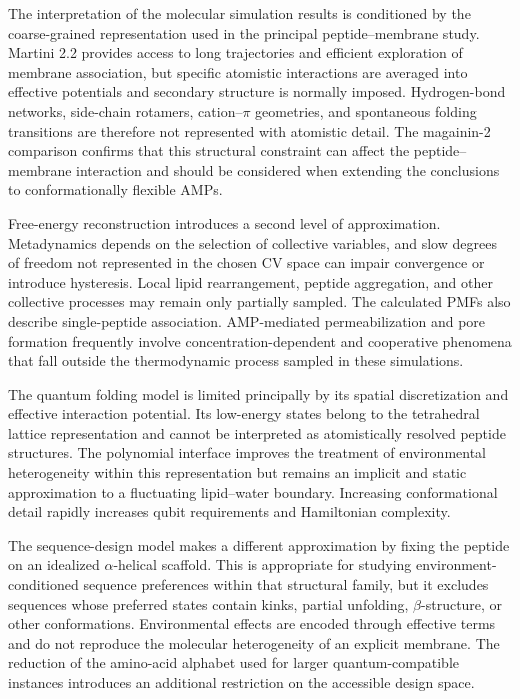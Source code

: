 The interpretation of the molecular simulation results is conditioned by the coarse-grained representation used in the principal peptide--membrane study. Martini 2.2 provides access to long trajectories and efficient exploration of membrane association, but specific atomistic interactions are averaged into effective potentials and secondary structure is normally imposed. Hydrogen-bond networks, side-chain rotamers, cation--$\pi$ geometries, and spontaneous folding transitions are therefore not represented with atomistic detail. The magainin-2 comparison confirms that this structural constraint can affect the peptide--membrane interaction and should be considered when extending the conclusions to conformationally flexible AMPs.

Free-energy reconstruction introduces a second level of approximation. Metadynamics depends on the selection of collective variables, and slow degrees of freedom not represented in the chosen CV space can impair convergence or introduce hysteresis. Local lipid rearrangement, peptide aggregation, and other collective processes may remain only partially sampled. The calculated PMFs also describe single-peptide association. AMP-mediated permeabilization and pore formation frequently involve concentration-dependent and cooperative phenomena that fall outside the thermodynamic process sampled in these simulations.

The quantum folding model is limited principally by its spatial discretization and effective interaction potential. Its low-energy states belong to the tetrahedral lattice representation and cannot be interpreted as atomistically resolved peptide structures. The polynomial interface improves the treatment of environmental heterogeneity within this representation but remains an implicit and static approximation to a fluctuating lipid--water boundary. Increasing conformational detail rapidly increases qubit requirements and Hamiltonian complexity.

The sequence-design model makes a different approximation by fixing the peptide on an idealized $\alpha$-helical scaffold. This is appropriate for studying environment-conditioned sequence preferences within that structural family, but it excludes sequences whose preferred states contain kinks, partial unfolding, $\beta$-structure, or other conformations. Environmental effects are encoded through effective terms and do not reproduce the molecular heterogeneity of an explicit membrane. The reduction of the amino-acid alphabet used for larger quantum-compatible instances introduces an additional restriction on the accessible design space.

